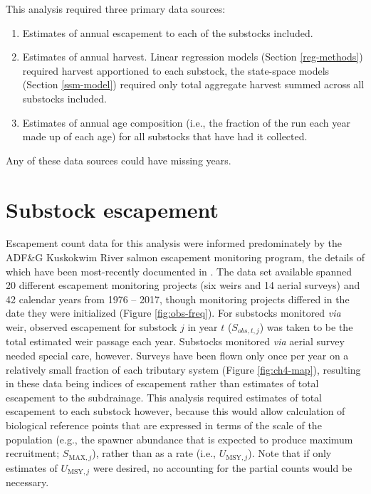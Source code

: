 \documentclass[12pt,]{book}
\theoremstyle{definition}
\theoremstyle{definition}
\theoremstyle{definition}
\theoremstyle{remark}
\begin{document}
\noindent
This analysis required three primary data sources:

\begin{enumerate}
\def\labelenumi{(\arabic{enumi})}
\item
  Estimates of annual escapement to each of the substocks included.
\item
  Estimates of annual harvest. Linear regression models (Section
  \ref{reg-methods}) required harvest apportioned to each substock, the
  state-space models (Section \ref{ssm-model}) required only total
  aggregate harvest summed across all substocks included.
\item
  Estimates of annual age composition (i.e., the fraction of the run
  each year made up of each age) for all substocks that have had it
  collected.
\end{enumerate}

\noindent
Any of these data sources could have missing years.

\section{Substock escapement}\label{air-expansion}

\noindent
Escapement count data for this analysis were informed predominately by
the ADF\&G Kuskokwim River salmon escapement monitoring program, the
details of which have been most-recently documented in
\citet{head-smith-2018}. The data set available spanned 20 different
escapement monitoring projects (six weirs and 14 aerial surveys) and 42
calendar years from 1976 -- 2017, though monitoring projects differed in
the date they were initialized (Figure \ref{fig:obs-freq}). For
substocks monitored \emph{via} weir, observed escapement for substock
\(j\) in year \(t\) (\(S_{obs,t,j}\)) was taken to be the total
estimated weir passage each year. Substocks monitored \emph{via} aerial
survey needed special care, however. Surveys have been flown only once
per year on a relatively small fraction of each tributary system (Figure
\ref{fig:ch4-map}), resulting in these data being indices of escapement
rather than estimates of total escapement to the subdrainage. This
analysis required estimates of total escapement to each substock
however, because this would allow calculation of biological reference
points that are expressed in terms of the scale of the population (e.g.,
the spawner abundance that is expected to produce maximum recruitment;
\(S_{\text{MAX},j}\)), rather than as a rate (i.e.,
\(U_{\text{MSY},j}\)). Note that if only estimates of
\(U_{\text{MSY},j}\) were desired, no accounting for the partial counts
would be necessary.
\end{document}
